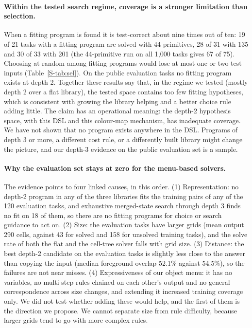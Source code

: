 \documentclass[sigconf,nonacm]{acmart}
\begin{document}
\paragraph{Within the tested search regime, coverage is a stronger limitation than selection.} When a fitting program is found it is test-correct about nine times out of ten: 19 of 21 tasks with a fitting program are solved with 44 primitives, 28 of 31 with 135 and 30 of 33 with 201 (the 44-primitive run on all 1{,}000 tasks gives 67 of 75). Choosing at random among fitting programs would lose at most one or two test inputs (Table~\ref{S-tab:sel}). On the public evaluation tasks no fitting program exists at depth 2. Together these results say that, in the regime we tested (mostly depth 2 over a flat library), the tested space contains too few fitting hypotheses, which is consistent with growing the library helping and a better choice rule adding little. The claim has an operational meaning: the depth-2 hypothesis space, with this DSL and this colour-map mechanism, has inadequate coverage. We have not shown that no program exists anywhere in the DSL. Programs of depth 3 or more, a different cost rule, or a differently built library might change the picture, and our depth-3 evidence on the public evaluation set is a sample.

\paragraph{Why the evaluation set stays at zero for the menu-based solvers.} The evidence points to four linked causes, in this order. (1) Representation: no depth-2 program in any of the three libraries fits the training pairs of any of the 120 evaluation tasks, and exhaustive merged-state search through depth 3 finds no fit on 18 of them, so there are no fitting programs for choice or search guidance to act on. (2) Size: the evaluation tasks have larger grids (mean output 290 cells, against 43 for solved and 158 for unsolved training tasks), and the solve rate of both the flat and the cell-tree solver falls with grid size. (3) Distance: the best depth-2 candidate on the evaluation tasks is slightly less close to the answer than copying the input (median foreground overlap 52.1\% against 54.5\%), so the failures are not near misses. (4) Expressiveness of our object menu: it has no variables, no multi-step rules chained on each other's output and no general correspondence across size changes, and extending it increased training coverage only. We did not test whether adding these would help, and the first of them is the direction we propose. We cannot separate size from rule difficulty, because larger grids tend to go with more complex rules.
\end{document}
